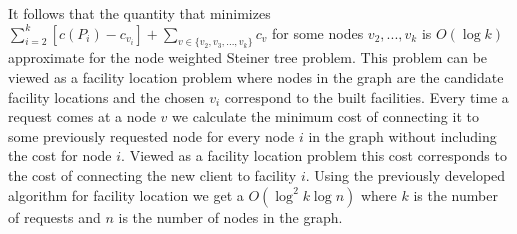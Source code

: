 It follows that the quantity that minimizes $\sum_{i=2}^k [c(P_i) - c_{v_i}] + \sum_{v \in \{v_2, v_3, ... , v_k\}} c_{v}$ for some nodes $v_2,...,v_k$ is $O(\log k)$ approximate for the node weighted Steiner tree problem. This problem can be viewed as a facility location problem where nodes in the graph are the candidate facility locations and the chosen $v_i$ correspond to the built facilities. Every time a request comes at a node $v$ we calculate the minimum cost of connecting it to some previously requested node for every node $i$ in the graph without including the cost for node $i$. Viewed as a facility location problem this cost corresponds to the cost of connecting the new client to facility $i$. Using the previously developed algorithm for facility location we get a $O(\log^2 k \log n)$ where $k$ is the number of requests and $n$ is the number of nodes in the graph. 

